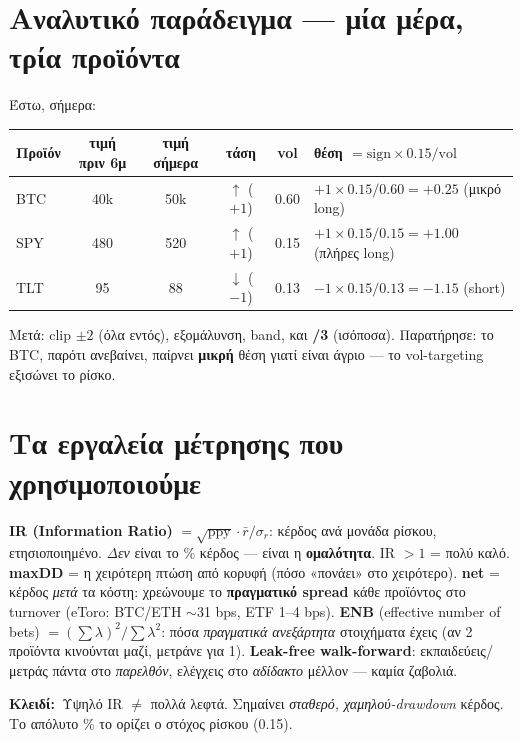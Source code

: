 \documentclass[11pt]{article}
\newcommand{\key}[1]{\par\medskip\noindent\colorbox{soft}{\parbox{\dimexpr\linewidth-2\fboxsep}{\textcolor{accent}{\textbf{Κλειδί:}}\ #1}}\par\medskip}
\begin{document}
\section{Αναλυτικό παράδειγμα --- μία μέρα, τρία προϊόντα}
Έστω, σήμερα:
\begin{center}\small
\begin{tabular}{lccccl}
\toprule
Προϊόν & τιμή πριν 6μ & τιμή σήμερα & τάση & vol & θέση $=\mathrm{sign}\times 0.15/\text{vol}$ \\
\midrule
BTC & 40k & 50k & $\uparrow$ ($+1$) & 0.60 & $+1\times 0.15/0.60 = \mathbf{+0.25}$ (μικρό long) \\
SPY & 480 & 520 & $\uparrow$ ($+1$) & 0.15 & $+1\times 0.15/0.15 = \mathbf{+1.00}$ (πλήρες long) \\
TLT & 95 & 88 & $\downarrow$ ($-1$) & 0.13 & $-1\times 0.15/0.13 = \mathbf{-1.15}$ (short) \\
\bottomrule
\end{tabular}
\end{center}
Μετά: clip $\pm2$ (όλα εντός), εξομάλυνση, band, και \textbf{/3} (ισόποσα). Παρατήρησε: το BTC, παρότι
ανεβαίνει, παίρνει \textbf{μικρή} θέση γιατί είναι άγριο --- το vol-targeting εξισώνει το ρίσκο.

\section{Τα εργαλεία μέτρησης που χρησιμοποιούμε}
\textbf{IR (Information Ratio)} $=\sqrt{\text{ppy}}\cdot \bar r/\sigma_r$: κέρδος ανά μονάδα ρίσκου,
ετησιοποιημένο. \emph{Δεν} είναι το \% κέρδος --- είναι η \textbf{ομαλότητα}. IR $>1$ = πολύ καλό.
\textbf{maxDD} = η χειρότερη πτώση από κορυφή (πόσο «πονάει» στο χειρότερο). \textbf{net} = κέρδος
\emph{μετά} τα κόστη: χρεώνουμε το \textbf{πραγματικό spread} κάθε προϊόντος στο turnover (eToro: BTC/ETH
$\sim$31 bps, ETF 1--4 bps). \textbf{ENB} (effective number of bets) $=(\sum\lambda)^2/\sum\lambda^2$:
πόσα \emph{πραγματικά ανεξάρτητα} στοιχήματα έχεις (αν 2 προϊόντα κινούνται μαζί, μετράνε για 1).
\textbf{Leak-free walk-forward}: εκπαιδεύεις/μετράς πάντα στο \emph{παρελθόν}, ελέγχεις στο \emph{αδίδακτο}
μέλλον --- καμία ζαβολιά.
\key{Υψηλό IR $\ne$ πολλά λεφτά. Σημαίνει \emph{σταθερό, χαμηλού-drawdown} κέρδος. Το απόλυτο \% το ορίζει
ο στόχος ρίσκου (0.15).}
\end{document}
